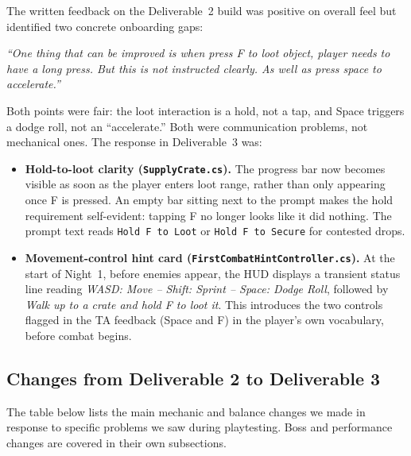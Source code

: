 \documentclass[11pt,a4paper]{article}
\begin{document}
The written feedback on the Deliverable~2 build was positive on overall feel but identified two concrete onboarding gaps:

\begin{tcolorbox}[tableframe]
\small
\textit{``One thing that can be improved is when press F to loot object, player needs to have a long press. But this is not instructed clearly. As well as press space to accelerate.''}
\end{tcolorbox}

Both points were fair: the loot interaction is a hold, not a tap, and Space triggers a dodge roll, not an ``accelerate.'' Both were communication problems, not mechanical ones. The response in Deliverable~3 was:

\begin{itemize}[noitemsep]
  \item \textbf{Hold-to-loot clarity (\texttt{SupplyCrate.cs}).} The progress bar now becomes visible as soon as the player enters loot range, rather than only appearing once F is pressed. An empty bar sitting next to the prompt makes the hold requirement self-evident: tapping F no longer looks like it did nothing. The prompt text reads \texttt{Hold F to Loot} or \texttt{Hold F to Secure} for contested drops.
  \item \textbf{Movement-control hint card (\texttt{FirstCombatHintController.cs}).} At the start of Night~1, before enemies appear, the HUD displays a transient status line reading \textit{WASD: Move \;--\; Shift: Sprint \;--\; Space: Dodge Roll}, followed by \textit{Walk up to a crate and hold F to loot it}. This introduces the two controls flagged in the TA feedback (Space and F) in the player's own vocabulary, before combat begins.
\end{itemize}

\subsection{Changes from Deliverable 2 to Deliverable 3}

The table below lists the main mechanic and balance changes we made in response to specific problems we saw during playtesting. Boss and performance changes are covered in their own subsections.
\end{document}
